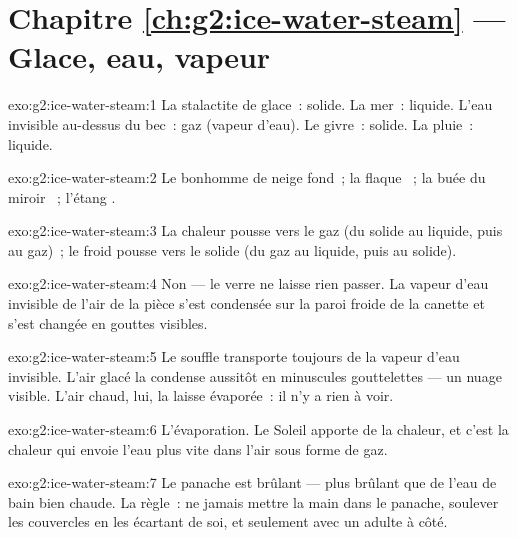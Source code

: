 \section*{Chapitre \ref{ch:g2:ice-water-steam} --- Glace, eau, vapeur}

\begin{solution}{exo:g2:ice-water-steam:1}
La stalactite de glace~: solide. La mer~: liquide. L'eau invisible
au-dessus du bec~: gaz (vapeur d'eau). Le givre~: solide. La pluie~:
liquide.
\end{solution}

\begin{solution}{exo:g2:ice-water-steam:2}
Le bonhomme de neige fond~; la flaque ~; la buée du miroir
~; l'étang .
\end{solution}

\begin{solution}{exo:g2:ice-water-steam:3}
La chaleur pousse vers le gaz (du solide au liquide, puis au gaz)~;
le froid pousse vers le solide (du gaz au liquide, puis au solide).
\end{solution}

\begin{solution}{exo:g2:ice-water-steam:4}
Non --- le verre ne laisse rien passer. La vapeur d'eau invisible de
l'air de la pièce s'est condensée sur la paroi froide de la canette
et s'est changée en gouttes visibles.
\end{solution}

\begin{solution}{exo:g2:ice-water-steam:5}
Le souffle transporte toujours de la vapeur d'eau invisible. L'air
glacé la condense aussitôt en minuscules gouttelettes --- un nuage
visible. L'air chaud, lui, la laisse évaporée~: il n'y a rien à voir.
\end{solution}

\begin{solution}{exo:g2:ice-water-steam:6}
L'évaporation. Le Soleil apporte de la chaleur, et c'est la chaleur
qui envoie l'eau plus vite dans l'air sous forme de gaz.
\end{solution}

\begin{solution}{exo:g2:ice-water-steam:7}
Le panache est brûlant --- plus brûlant que de l'eau de bain bien
chaude. La règle~: ne jamais mettre la main dans le panache,
soulever les couvercles en les écartant de soi, et seulement avec un
adulte à côté.
\end{solution}

